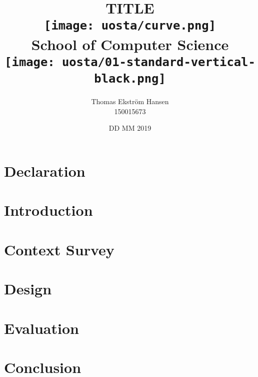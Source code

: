 \documentclass[12pt]{report}
\title{
    {TITLE}\\
    \vspace{2cm}
    {\texttt{[image: uosta/curve.png]}}\\
    {\fontfamily{ppl}\selectfont\large School of Computer Science}\\
    \vspace{-0.8cm}
    {\texttt{[image: uosta/01-standard-vertical-black.png]}}\\
    \vspace{-2cm}
}
\author{
    {Thomas Ekstr{\" o}m Hansen}\\
    {150015673}
}
\date{DD MM 2019}
\begin{document}
    \maketitle
    
    \tableofcontents
    
    \chapter*{Declaration}
    
    
    \chapter{Introduction}
    
    
    \chapter{Context Survey}
    
        
    \chapter{Design}
    
    
    \chapter{Evaluation}
    
        
    \chapter{Conclusion}
    
    
    
    
\end{document}
